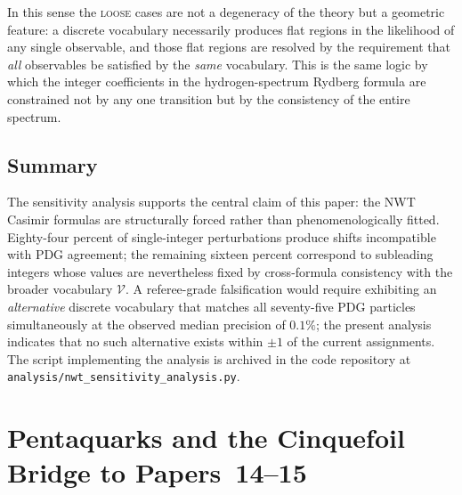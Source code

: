 \documentclass[11pt]{article}
\begin{document}
In this sense the \textsc{loose} cases are not a degeneracy of the
theory but a geometric feature: a discrete vocabulary necessarily
produces flat regions in the likelihood of any single observable,
and those flat regions are resolved by the requirement that
\emph{all} observables be satisfied by the \emph{same} vocabulary.
This is the same logic by which the integer coefficients in the
hydrogen-spectrum Rydberg formula are constrained not by any one
transition but by the consistency of the entire spectrum.

\subsection{Summary}

The sensitivity analysis supports the central claim of this paper:
the NWT Casimir formulas are structurally forced rather than
phenomenologically fitted.  Eighty-four percent of single-integer
perturbations produce shifts incompatible with PDG agreement; the
remaining sixteen percent correspond to subleading integers whose
values are nevertheless fixed by cross-formula consistency with the
broader vocabulary $\mathcal{V}$.  A referee-grade falsification
would require exhibiting an \emph{alternative} discrete vocabulary
that matches all seventy-five PDG particles simultaneously at the
observed median precision of $0.1\%$; the present analysis
indicates that no such alternative exists within $\pm 1$ of the
current assignments.  The script implementing the analysis is
archived in the code repository at
\texttt{analysis/nwt\_sensitivity\_analysis.py}.

\section{Pentaquarks and the Cinquefoil Bridge to Papers~14--15}
\label{sec:pentaquarks}
\end{document}
